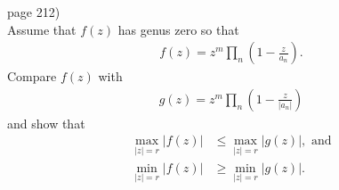 \documentclass{article}
\newenvironment{problem}[2][Problem]{\begin{trivlist}
\item[\hskip \labelsep {\bfseries #1}\hskip \labelsep {\bfseries #2.}]}{\end{trivlist}}
\begin{document}
\begin{problem}{2} (page 212) \\
  Assume that $f(z)$ has genus zero so that \begin{align}
    f(z) = z^m \prod_n \left(1-\frac{z}{a_n}\right).
  \end{align} Compare $f(z)$ with \begin{align}
    g(z) = z^m \prod_n \left(1 - \frac{z}{|a_n|}\right)
  \end{align} and show that \begin{align*}
    \max_{|z|=r} |f(z)| &\leq \max_{|z|=r} |g(z)|, \text{ and} \\
    \min_{|z|=r} |f(z)| &\geq \min_{|z|=r} |g(z)|.
  \end{align*}
\end{problem}
\end{document}
